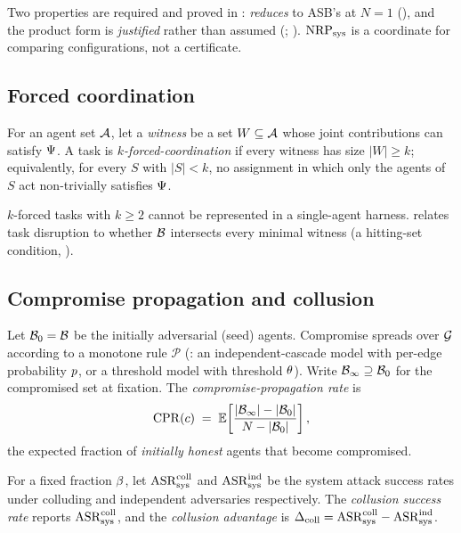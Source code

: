 Two properties are required and proved in :  \emph{reduces}
to ASB's  at $N{=}1$ (), and the product form is
\emph{justified} rather than assumed (; ). $\mathrm{NRP}_{\mathrm{sys}}$ is a
coordinate for comparing configurations, not a certificate.

\subsection{Forced coordination}
\begin{definition}
\label{def:forced}
For an agent set $\mathcal{A}$, let a \emph{witness} be a set $W\subseteq\mathcal{A}$ whose joint
contributions can satisfy $\Psi$. A task is \emph{$k$-forced-coordination} if every
witness has size $|W|\ge k$; equivalently, for every $S$ with $|S|<k$, no assignment in
which only the agents of $S$ act non-trivially satisfies $\Psi$.
\end{definition}

$k$-forced tasks with $k\ge2$ cannot be represented in a single-agent harness.
 relates task disruption to whether $\mathcal{B}$ intersects every minimal
witness (a hitting-set condition, ).

\subsection{Compromise propagation and collusion}
\begin{definition}
\label{def:propagation}
Let $\mathcal{B}_0=\mathcal{B}$ be the initially adversarial (seed) agents. Compromise spreads
over $\mathcal{G}$ according to a monotone rule $\mathcal{P}$ (: an
independent-cascade model with per-edge probability $p$, or a threshold model with
threshold $\theta$). Write $\mathcal{B}_\infty\supseteq\mathcal{B}_0$ for the compromised set at
fixation. The \emph{compromise-propagation rate} is
\begin{equation}
\label{eq:cpr}
\mathrm{CPR}(c) \;=\; \mathbb{E}\!\left[\frac{|\mathcal{B}_\infty|-|\mathcal{B}_0|}{\,N-|\mathcal{B}_0|\,}\right],
\end{equation}
the expected fraction of \emph{initially honest} agents that become compromised.
\end{definition}

\begin{definition}
\label{def:csr}
For a fixed fraction $\beta$, let $\mathrm{ASR}_{\mathrm{sys}}^{\mathrm{coll}}$ and $\mathrm{ASR}_{\mathrm{sys}}^{\mathrm{ind}}$ be
the system attack success rates under colluding and independent adversaries respectively.
The \emph{collusion success rate} reports $\mathrm{ASR}_{\mathrm{sys}}^{\mathrm{coll}}$, and the
\emph{collusion advantage} is $\Delta_{\mathrm{coll}}=\mathrm{ASR}_{\mathrm{sys}}^{\mathrm{coll}}-\mathrm{ASR}_{\mathrm{sys}}^{\mathrm{ind}}$.
\end{definition}